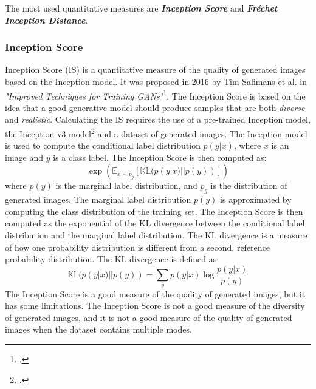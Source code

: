 
The most used quantitative measures are \textbf{\emph{Inception Score}} and \textbf{\emph{Fréchet Inception Distance}}.
\subsubsection{Inception Score}
\label{subsubsec:inception-score}
Inception Score (IS) is a quantitative measure of the quality of generated images based on the Inception model.
It was proposed in 2016 by Tim Salimans et al. in \emph{"Improved Techniques for Training GANs"}\footcite{paper:salimans2016improved}.
The Inception Score is based on the idea that a good generative model should produce samples that are both \emph{diverse} and \emph{realistic}.
Calculating the IS requires the use of a pre-trained Inception model, the Inception v3 model\footcite{paper:inceptionv3} and a dataset of generated images.
The Inception model is used to compute the conditional label distribution $p(y|x)$, where $x$ is an image and $y$ is a class label.
The Inception Score is then computed as:
\begin{equation}
    \label{eq:inception-score}
    \exp \left( \mathbb{E}_{x \sim p_{g}} \left[ \mathbb{KL}(p(y|x) || p(y)) \right] \right)
\end{equation}
where $p(y)$ is the marginal label distribution, and $p_{g}$ is the distribution of generated images.
The marginal label distribution $p(y)$ is approximated by computing the class distribution of the training set.
The Inception Score is then computed as the exponential of the KL divergence between the conditional label distribution and the marginal label distribution.
The KL divergence is a measure of how one probability distribution is different from a second, reference probability distribution.
The KL divergence is defined as:
\begin{equation}
    \label{eq:kl-divergence}
    \mathbb{KL}(p(y|x) || p(y)) = \sum_{y} p(y|x) \log \frac{p(y|x)}{p(y)}
\end{equation}
The Inception Score is a good measure of the quality of generated images, but it has some limitations.
The Inception Score is not a good measure of the diversity of generated images, and it is not a good measure of the quality of generated images when the dataset contains multiple modes.
